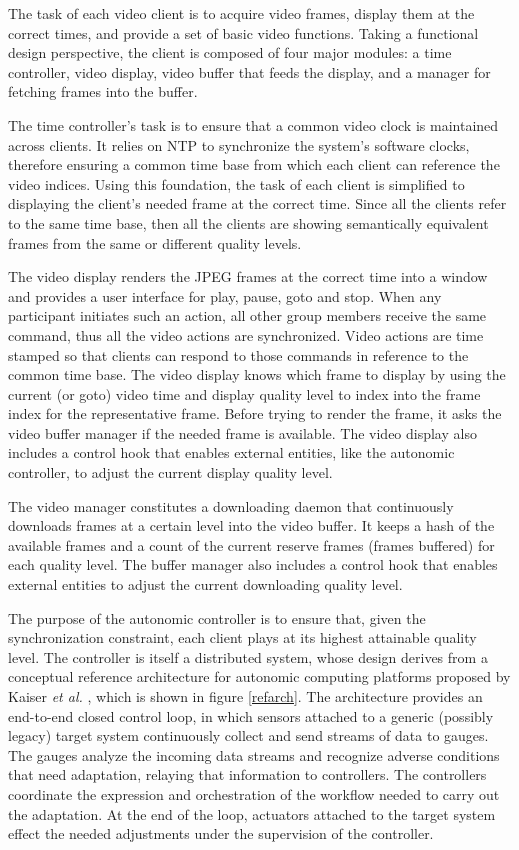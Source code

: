 \documentclass{sig-alternate}
\begin{document}

The task of each video client is to acquire video frames, display them
at the correct times, and provide a set of basic video functions.
Taking a functional design perspective, the client is composed of four
major modules: a time controller, video display, video buffer that
feeds the display, and a manager for fetching frames into the buffer.

The time controller's task is to ensure that a common video clock is
maintained across clients.  It relies on NTP to synchronize the
system's software clocks, therefore ensuring a common time base from
which each client can reference the video indices.  Using this
foundation, the task of each client is simplified to displaying the
client's needed frame at the correct time.  Since all the clients
refer to the same time base, then all the clients are showing
semantically equivalent frames from the same or different quality
levels.

The video display renders the JPEG frames at the correct time into a
window and provides a user interface for play, pause, goto and stop.
When any participant initiates such an action, all other group members
receive the same command, thus all the video actions are synchronized.
Video actions are time stamped so that clients can respond to those
commands in reference to the common time base.  The video display
knows which frame to display by using the current (or goto) video time
and display quality level to index into the frame index for the
representative frame.  Before trying to render the frame, it asks the
video buffer manager if the needed frame is available.  The video
display also includes a control hook that enables external entities,
like the autonomic controller, to adjust the current display quality
level.

The video manager constitutes a downloading daemon that continuously
downloads frames at a certain level into the video buffer.  It keeps a
hash of the available frames and a count of the current reserve frames
(frames buffered) for each quality level.  The buffer manager also
includes a control hook that enables external entities to adjust the
current downloading quality level.


The purpose of the autonomic controller is to ensure that, given the
synchronization constraint, each client plays at its highest
attainable quality level.  The controller is itself a distributed
system, whose design derives from a conceptual reference architecture
for autonomic computing platforms proposed by Kaiser {\it et al.}
\cite{REFARCH}, which is shown in figure \ref{refarch}. The
architecture provides an end-to-end closed control loop, in which
sensors attached to a generic (possibly legacy) target system
continuously collect and send streams of data to gauges.  The gauges
analyze the incoming data streams and recognize adverse conditions
that need adaptation, relaying that information to controllers.  The
controllers coordinate the expression and orchestration of the
workflow needed to carry out the adaptation.  At the end of the loop,
actuators attached to the target system effect the needed adjustments
under the supervision of the controller.
\end{document}

